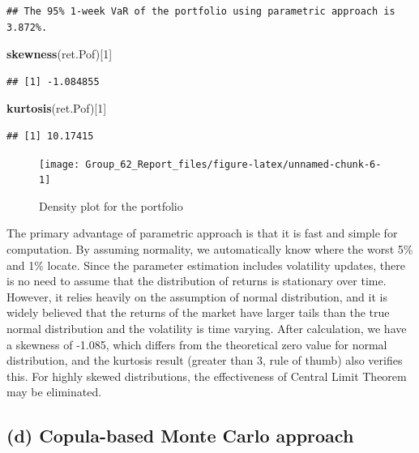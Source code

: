 \documentclass[]{article}
\newenvironment{Shaded}{\begin{snugshade}}{\end{snugshade}}
\newcommand{\DecValTok}[1]{\textcolor[rgb]{0.00,0.00,0.81}{#1}}
\newcommand{\KeywordTok}[1]{\textcolor[rgb]{0.13,0.29,0.53}{\textbf{#1}}}
\newcommand{\NormalTok}[1]{#1}
\begin{document}
\begin{verbatim}
## The 95% 1-week VaR of the portfolio using parametric approach is 3.872%.
\end{verbatim}

\begin{Shaded}
\begin{Highlighting}[]
\KeywordTok{skewness}\NormalTok{(ret.Pof)[}\DecValTok{1}\NormalTok{]}
\end{Highlighting}
\end{Shaded}

\begin{verbatim}
## [1] -1.084855
\end{verbatim}

\begin{Shaded}
\begin{Highlighting}[]
\KeywordTok{kurtosis}\NormalTok{(ret.Pof)[}\DecValTok{1}\NormalTok{]}
\end{Highlighting}
\end{Shaded}

\begin{verbatim}
## [1] 10.17415
\end{verbatim}

\begin{figure}

{\centering \texttt{[image: Group\_62\_Report\_files/figure-latex/unnamed-chunk-6-1]} 

}

\caption{Density plot for the portfolio}\label{fig:unnamed-chunk-6}
\end{figure}

The primary advantage of parametric approach is that it is fast and
simple for computation. By assuming normality, we automatically know
where the worst 5\% and 1\% locate. Since the parameter estimation
includes volatility updates, there is no need to assume that the
distribution of returns is stationary over time. However, it relies
heavily on the assumption of normal distribution, and it is widely
believed that the returns of the market have larger tails than the true
normal distribution and the volatility is time varying. After
calculation, we have a skewness of -1.085, which differs from the
theoretical zero value for normal distribution, and the kurtosis result
(greater than 3, rule of thumb) also verifies this. For highly skewed
distributions, the effectiveness of Central Limit Theorem may be
eliminated.

\hypertarget{d-copula-based-monte-carlo-approach}{%
\subsection{(d) Copula-based Monte Carlo
approach}\label{d-copula-based-monte-carlo-approach}}
\end{document}
